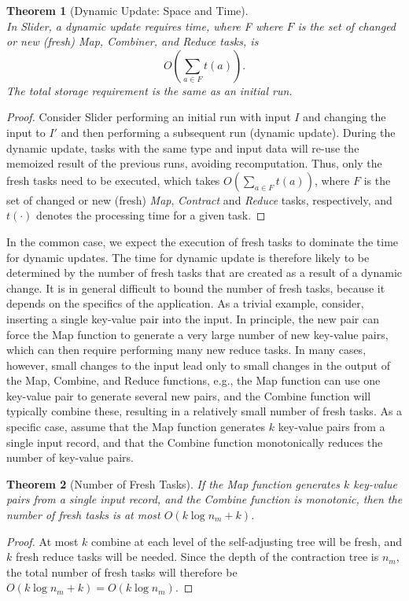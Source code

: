 \documentclass{article}
\newcommand{\projecttitle}{Slider\xspace}
\newtheorem{theorem}{Theorem}
\newcommand{\nkeyvaluemap}{\ensuremath{n_{m}}}
\begin{document}
\begin{theorem}[Dynamic Update: Space and Time]
~\\
In \projecttitle, a dynamic update requires time, where F where
$F$ is the set of changed or new (fresh) \emph{Map}, \emph{Combiner}, and
\emph{Reduce} tasks, is 
\[
O\left(\sum\limits_{a\in F} t(a) \right).
\]
The total storage requirement is the same as an initial
run.
\end{theorem}
\begin{proof}
Consider \projecttitle performing an initial run with input $I$ and
changing the input to $I'$ and then performing a subsequent run
(dynamic update). During the dynamic update, tasks with the same type
and input data will re-use the memoized result of the previous runs,
avoiding recomputation.  Thus, only the fresh tasks need to be
executed, which takes $O\left(\sum\limits_{a\in F} t(a)\right)$, where
$F$ is the set of changed or new (fresh) \emph{Map}, \emph{Contract}
and \emph{Reduce} tasks, respectively, and $t(\cdot)$ denotes the
processing time for a given task.
\end{proof}



In the common case, we expect the execution of fresh tasks to
dominate the time for dynamic updates. The time for dynamic update is therefore
likely to be determined by the number of fresh tasks that are created
as a result of a dynamic change.  It is in general difficult to bound
the number of fresh tasks, because it depends on the specifics of the
application.  As a trivial example, consider, inserting a single
key-value pair into the input.  In principle, the new pair can force the
Map function to generate a very large number of new key-value pairs,
which can then require performing many new reduce tasks.  In many
cases, however, small changes to the input lead only to small changes in
the output of the Map, Combine, and Reduce functions, e.g., the Map
function can use one key-value pair to generate several new pairs, and
the Combine function will typically combine these, resulting in a
relatively small number of fresh tasks.
As a specific case, assume that the Map function generates $k$
key-value pairs from a single input record, and that the Combine
function monotonically reduces the number of key-value pairs.  



\begin{theorem}[Number of Fresh Tasks]
\label{them:bound-fresh}
If the Map function generates $k$ key-value pairs from a single input
record, and  the Combine function is monotonic, then the number of
fresh tasks is at most $O(k\log{\nkeyvaluemap} + k)$.
\end{theorem}
\begin{proof}
At most $k$ combine at each level of the self-adjusting
tree will be fresh, and $k$ fresh reduce tasks will be needed. Since
the depth of the contraction tree is $\nkeyvaluemap$, the total number
of fresh tasks will therefore be $O(k\log{\nkeyvaluemap} + k) =
O(k\log{\nkeyvaluemap})$.
\end{proof}
\end{document}
